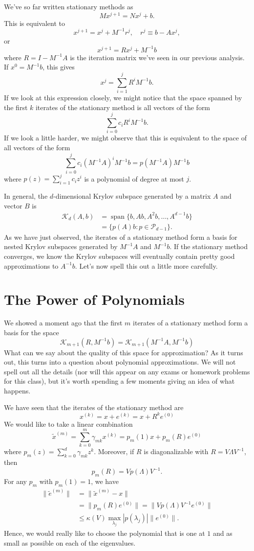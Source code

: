 \documentclass[12pt, leqno]{article}
\newcommand{\calK}{\mathcal{K}}
\newcommand{\calP}{\mathcal{P}}
\begin{document}
We've so far written stationary methods as
\[
  M x^{j+1} = N x^j + b.
\]
This is equivalent to
\[
  x^{j+1} = x^j + M^{-1} r^j, \quad r^j \equiv b-Ax^j,
\]
or
\[
  x^{j+1} = R x^j + M^{-1} b
\]
where $R = I-M^{-1} A$ is the iteration matrix we've seen
in our previous analysis.  If $x^0 = M^{-1} b$, this gives
\[
  x^j = \sum_{i=1}^j R^i M^{-1} b.
\]
If we look at this expression closely, we might notice that
the space spanned by the first $k$ iterates of the stationary
method is all vectors of the form
\[
  \sum_{i=0}^j c_i R^i M^{-1} b.
\]
If we look a little harder, we might observe that this is equivalent
to the space of all vectors of the form
\[
  \sum_{i=0}^j c_i (M^{-1} A)^i M^{-1} b = p(M^{-1} A) M^{-1} b
\]
where $p(z) = \sum_{i=1}^j c_i z^i$ is a polynomial of degree at most
$j$.

In general, the $d$-dimensional Krylov subspace generated by
a matrix $A$ and vector $B$ is
\begin{align*}
  \calK_d(A,b)
  &= \operatorname{span}\{ b, Ab, A^2 b, \ldots, A^{d-1} b \} \\
  &= \{ p(A) b : p \in \calP_{d-1} \}.
\end{align*}
As we have just observed, the iterates of a stationary method
form a basis for nested Krylov subspaces generated by $M^{-1}A$
and $M^{-1}b$.  If the stationary method converges, we know
the Krylov subspaces will eventually contain pretty good
approximations to $A^{-1} b$.  Let's now spell this out a little
more carefully.

\section{The Power of Polynomials}

We showed a moment ago that the first $m$ iterates of a stationary
method form a basis for the space
\[
  \calK_{m+1}(R, M^{-1}b) = \calK_{m+1}(M^{-1} A, M^{-1} b)
\]
What can we say about the quality of this space for approximation?  As
it turns out, this turns into a question about polynomial
approximations.  We will not spell out all the details (nor will this
appear on any exams or homework problems for this class), but it's
worth spending a few moments giving an idea of what happens.

We have seen that the iterates of the stationary method are
\[
  x^{(k)} = x + e^{(k)} = x + R^k e^{(0)}
\]
We would like to take a linear combination
\[
  \tilde x^{(m)} = \sum_{k=0}^m \gamma_{mk} x^{(k)} = p_m(1) x + p_m(R) e^{(0)}
\]
where $p_m(z) = \sum_{k=0}^d \gamma_{mk} z^k$.  Moreover,
if $R$ is diagonalizable with $R = V \Lambda V^{-1}$, then
\[
  p_m(R) = V p(\Lambda) V^{-1}.
\]
For any $p_m$ with $p_m(1) = 1$, we have
\begin{align*}
\|\tilde{e}^{(m)}\|
&= \|\tilde{x}^{(m)}-x\| \\
&= \|p_m(R) e^{(0)}\| = \|V p(\Lambda) V^{-1} e^{(0)}\| \\
&\leq \kappa(V) \max_{\lambda_j} |p(\lambda_j)| \|e^{(0)}\|.
\end{align*}
Hence, we would really like to choose the polynomial that is one
at $1$ and as small as possible on each of the eigenvalues.
\end{document}
